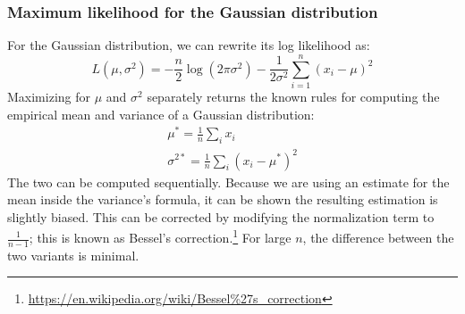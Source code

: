 \subsubsection*{Maximum likelihood for the Gaussian distribution}

For the Gaussian distribution, we can rewrite its log likelihood as:
%
$$
L(\mu, \sigma^2) = - \frac{n}{2}\log(2\pi \sigma^2) - \frac{1}{2\sigma^2}\sum_{i=1}^n(x_i-\mu)^2
$$
%
Maximizing for $\mu$ and $\sigma^2$ separately returns the known rules for computing the empirical mean and variance of a Gaussian distribution:
%
\begin{gather}
\mu^*=\frac{1}{n}\sum_i x_i \\\sigma^{2*}=\frac{1}{n}\sum_i(x_i-\mu^*)^2
\end{gather}
%
The two can be computed sequentially. Because we are using an estimate for the mean inside the variance’s formula, it can be shown the resulting estimation is slightly biased. This can be corrected by modifying the normalization term to $\frac{1}{n-1}$; this is known as Bessel’s correction.\footnote{\url{https://en.wikipedia.org/wiki/Bessel\%27s\_correction}} For large $n$, the difference between the two variants is minimal.